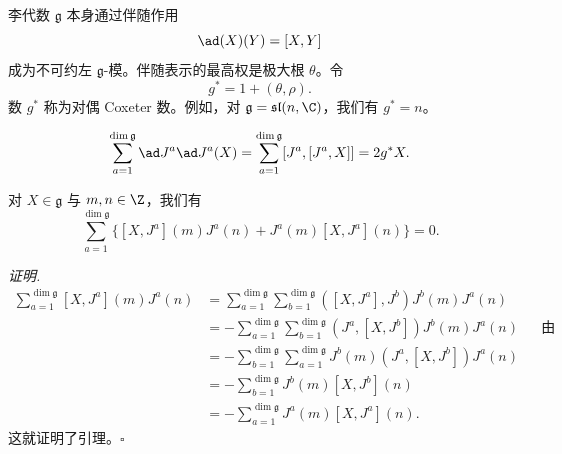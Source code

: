 李代数 $\mathfrak{g}$ 本身通过伴随作用
\[
\ad(X)(Y)=[X,Y]
\]
成为不可约左 $\mathfrak{g}$-模。伴随表示的最高权是极大根 $\theta$。令
\begin{equation}
g^*=1+(\theta,\rho). \tag{2.15}
\end{equation}
数 $g^*$ 称为对偶 Coxeter 数。例如，对 $\mathfrak{g}=\mathfrak{sl}(n,\C)$，我们有 $g^*=n$。

\begin{corollary}[2.9]
\[
\sum_{a=1}^{\dim\mathfrak{g}}\ad J^{a}\ad J^{a}(X)
=\sum_{a=1}^{\dim\mathfrak{g}}[J^{a},[J^{a},X]]=2g^*X.
\]
\end{corollary}

\begin{lemma}[2.10]
对 $X\in\mathfrak{g}$ 与 $m,n\in\Z$，我们有
\[
\sum_{a=1}^{\dim\mathfrak{g}}\Big\{[X,J^{a}](m)J^{a}(n)+J^{a}(m)[X,J^{a}](n)\Big\}=0.
\]
\end{lemma}

\noindent\textit{证明.}\quad
\begin{align*}
\sum_{a=1}^{\dim\mathfrak{g}}[X,J^{a}](m)J^{a}(n)
&=\sum_{a=1}^{\dim\mathfrak{g}}\sum_{b=1}^{\dim\mathfrak{g}}
([X,J^{a}],J^{b})J^{b}(m)J^{a}(n)\\
&=-\sum_{a=1}^{\dim\mathfrak{g}}\sum_{b=1}^{\dim\mathfrak{g}}
(J^{a},[X,J^{b}])J^{b}(m)J^{a}(n)
&&\text{由 (2.1)--(2.2)}\\
&=-\sum_{b=1}^{\dim\mathfrak{g}}\sum_{a=1}^{\dim\mathfrak{g}}
J^{b}(m)(J^{a},[X,J^{b}])J^{a}(n)\\
&=-\sum_{b=1}^{\dim\mathfrak{g}}J^{b}(m)[X,J^{b}](n)\\
&=-\sum_{a=1}^{\dim\mathfrak{g}}J^{a}(m)[X,J^{a}](n).
\end{align*}
这就证明了引理。\hfill$\square$

